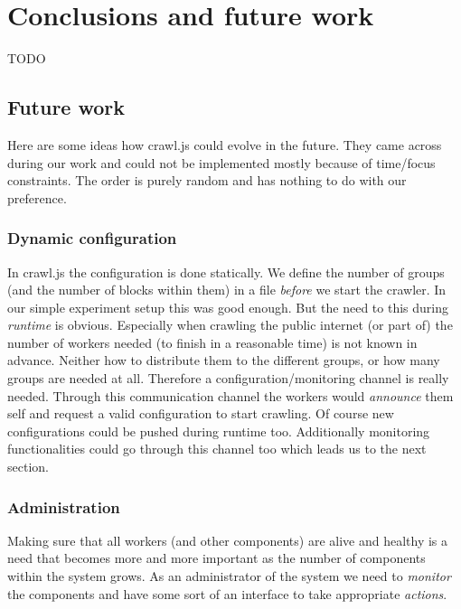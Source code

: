 
\chapter{Conclusions and future work} %
\label{Chapter6} %

TODO

\section{Future work}
Here are some ideas how crawl.js could evolve in the future. They came across during our work and could not be implemented mostly because of time/focus constraints. The order is purely random and has nothing to do with our preference.

\subsection{Dynamic configuration}
In crawl.js the configuration is done statically. We define the number of groups (and the number of blocks within them) in a file \emph{before} we start the crawler. In our simple experiment setup this was good enough. But the need to this during \emph{runtime} is obvious. Especially when crawling the public internet (or part of) the number of workers needed (to finish in a reasonable time) is not known in advance. Neither how to distribute them to the different groups, or how many groups are needed at all. Therefore a configuration/monitoring channel is really needed. Through this communication channel the workers would \emph{announce} them self and request a valid configuration to start crawling. Of course new configurations could be pushed during runtime too. Additionally monitoring functionalities could go through this channel too which leads us to the next section. 

\subsection{Administration}
Making sure that all workers (and other components) are alive and healthy is a need that becomes more and more important as the number of components within the system grows. As an administrator of the system we need to \emph{monitor} the components and have some sort of an interface to take appropriate \emph{actions}.


